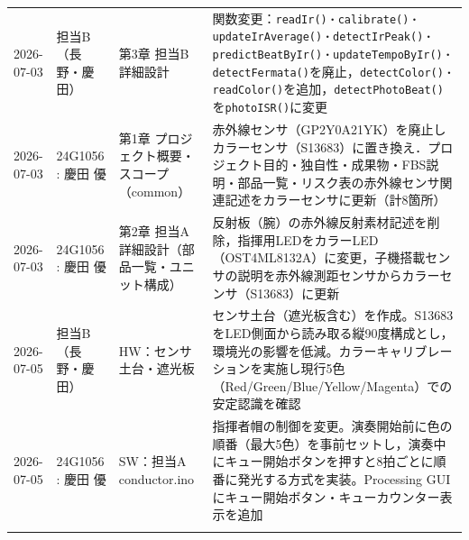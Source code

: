 \begin{longtable}{p{2.2cm}p{3.5cm}p{4cm}p{5.5cm}}
2026-07-03 & 担当B（長野・慶田） & 第3章 担当B 詳細設計 & 関数変更：\texttt{readIr()・calibrate()・updateIrAverage()・detectIrPeak()・predictBeatByIr()・updateTempoByIr()・detectFermata()}を廃止，\texttt{detectColor()・readColor()}を追加，\texttt{detectPhotoBeat()}を\texttt{photoISR()}に変更 \\
2026-07-03 & 24G1056 : 慶田 優 & 第1章 プロジェクト概要・スコープ（common） & 赤外線センサ（GP2Y0A21YK）を廃止しカラーセンサ（S13683）に置き換え．プロジェクト目的・独自性・成果物・FBS説明・部品一覧・リスク表の赤外線センサ関連記述をカラーセンサに更新（計8箇所） \\
2026-07-03 & 24G1056 : 慶田 優 & 第2章 担当A詳細設計（部品一覧・ユニット構成） & 反射板（腕）の赤外線反射素材記述を削除，指揮用LEDをカラーLED（OST4ML8132A）に変更，子機搭載センサの説明を赤外線測距センサからカラーセンサ（S13683）に更新 \\
2026-07-05 & 担当B（長野・慶田） & HW：センサ土台・遮光板 & センサ土台（遮光板含む）を作成。S13683をLED側面から読み取る縦90度構成とし，環境光の影響を低減。カラーキャリブレーションを実施し現行5色（Red/Green/Blue/Yellow/Magenta）での安定認識を確認 \\
2026-07-05 & 24G1056 : 慶田 優 & SW：担当A conductor.ino & 指揮者帽の制御を変更。演奏開始前に色の順番（最大5色）を事前セットし，演奏中にキュー開始ボタンを押すと8拍ごとに順番に発光する方式を実装。Processing GUIにキュー開始ボタン・キューカウンター表示を追加 \\

\bottomrule
\endfoot
\end{longtable}

